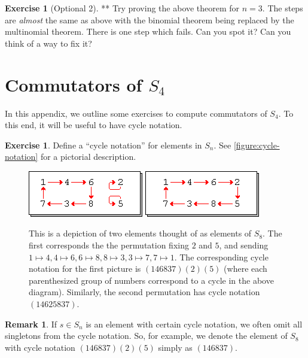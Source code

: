 \documentclass[reqno, 12pt, letter]{article}
\theoremstyle{plain}
\theoremstyle{definition}
\newtheorem{remark}[theorem]{Remark}
\newtheorem{exercise}[theorem]{Exercise}
\theoremstyle{remark}
\numberwithin{equation}{section}
\begin{document}
\begin{exercise}[Optional 2] **
	Try proving the above theorem for $ n=3$. The steps are \emph{almost} the same as above with the binomial theorem being replaced by the multinomial theorem. There is one step which fails. Can you spot it? Can you think of a way to fix it?
\end{exercise}


\newpage
\appendix
\section{Commutators of $S_4$}
\label{appendix:commutators-s4}
In this appendix, we outline some exercises to compute commutators of $S_4$.
To this end, it will be useful to have cycle notation.

\begin{exercise}
	\label{exercise:}
	Define a ``cycle notation'' for elements in $S_n$. See \autoref{figure:cycle-notation} for a pictorial description.
	\begin{figure}[h!]
		\includegraphics[scale=1.5]{cycle-1.png}
		\includegraphics[scale=1.5]{cycle-2.png}
		\caption{This is a depiction of two elements thought of as elements of $S_8$. The first corresponds the the permutation fixing $2$ and $5$,
			and sending $1 \mapsto 4, 4 \mapsto 6, 6 \mapsto 8, 8\mapsto 3, 3 \mapsto 7, 7\mapsto 1$.
			The corresponding cycle notation for the first picture is $(146837)(2)(5)$ (where each parenthesized group of numbers
			correspond to a cycle in the above diagram). Similarly, the second permutation has cycle notation $(14625837)$.}

		\label{figure:cycle-notation}\end{figure}
\end{exercise}
\begin{remark}
	\label{remark:}
	If $s \in S_n$ is an element with certain cycle notation, we often omit all singletons from the cycle notation.
	So, for example, we denote the element of $S_8$ with cycle notation $(146837)(2)(5)$ simply as $(146837)$.
\end{remark}
\end{document}
